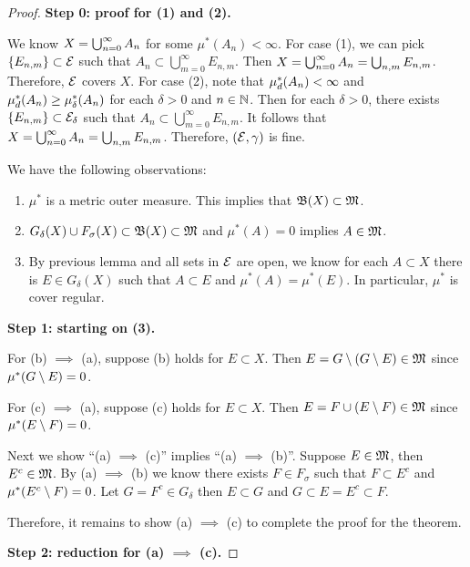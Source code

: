 \documentclass[a4paper]{article}
\begin{document}
\begin{proof}

\textbf{Step 0: proof for (1) and (2).} 

We know $X = \bigcup_{n=0}^\infty A_n$ for some $\mu^* 
(A_n) < \infty$. For case (1), we can pick $\left\{ E_{n, m} \right\}
\subset \mathcal{E}$ 
such that $A_n \subset \bigcup_{m=0}^\infty E_{n, m}$. Then 
$X = \bigcup_{n=0}^\infty A_n = \bigcup_{n, m} E_{n, m}$. Therefore, 
$\mathcal{E}$ covers $X$.
For case (2), note that $\mu^*_d(A_n) < \infty$ 
and $\mu^*_d(A_n) \geq \mu^*_\delta(A_n)$ 
for each $\delta > 0$ and $n \in \mathbb{N}$.
Then for each $\delta > 0$, 
there exists $\left\{ E_{n, m} \right\} \subset \mathcal{E}_\delta$
such that $A_n \subset \bigcup_{m=0}^\infty E_{n, m}$.
It follows that
$X = \bigcup_{n=0}^\infty A_n = \bigcup_{n, m} E_{n, m}$. Therefore, 
$(\mathcal{E}, \gamma)$ is fine.

We have the following observations: 
\begin{enumerate}
  \item $\mu^*$ is a metric outer measure. This implies that 
  $\mathfrak{B}(X) \subset \mathfrak{M}$. 
  \item $G_\delta(X) \cup F_\sigma(X) \subset \mathfrak{B}(X) \subset \mathfrak{M}$
  and $\mu^*(A) = 0$ implies $A \in \mathfrak{M}$.
  \item By previous lemma and all sets in $\mathcal{E}$ are open, 
  we know for each $A \subset X$ there is $E \in G_\delta(X)$
  such that $A \subset E$ and $\mu^*(A) = \mu^*(E)$. 
  In particular, $\mu^*$ is cover regular.
\end{enumerate}

\textbf{Step 1: starting on (3).} 

For (b) $\implies$ (a), suppose (b) holds for $E \subset X$.
Then $E = G \setminus (G \setminus E) \in \mathfrak{M}$ since 
$\mu^*(G \setminus E) = 0$.

For (c) $\implies$ (a), suppose (c) holds for $E \subset X$. 
Then $E = F \cup (E \setminus F) \in \mathfrak{M}$ since 
$\mu^*(E \setminus F) = 0$.

Next we show ``(a) $\implies$ (c)'' implies 
``(a) $\implies$ (b)''. Suppose $E \in \mathfrak{M}$, then 
$E^c \in \mathfrak{M}$. By (a) $\implies$ (b) we know there exists 
$F \in F_\sigma$ such that $F \subset E^c$ and 
$\mu^*(E^c \setminus F) = 0$. Let $G = F^c \in G_\delta$ 
then $E \subset G$ and $G \subset E = E^c \subset F$.

Therefore, it remains to show (a) $\implies$ (c) to complete 
the proof for the theorem. 

\textbf{Step 2: reduction for (a) $\implies$ (c).}


\end{proof}
\end{document}
